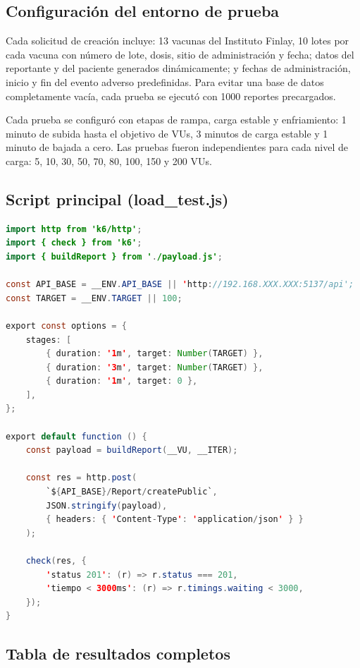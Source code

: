 \subsection{Configuración del entorno de prueba}

Cada solicitud de creación incluye: 13 vacunas del Instituto Finlay, 10 lotes por cada vacuna con número de lote, dosis, sitio de administración y fecha; datos del reportante y del paciente generados dinámicamente; y fechas de administración, inicio y fin del evento adverso predefinidas. Para evitar una base de datos completamente vacía, cada prueba se ejecutó con 1000 reportes precargados.

Cada prueba se configuró con etapas de rampa, carga estable y enfriamiento: 1 minuto de subida hasta el objetivo de VUs, 3 minutos de carga estable y 1 minuto de bajada a cero. Las pruebas fueron independientes para cada nivel de carga: 5, 10, 30, 50, 70, 80, 100, 150 y 200 VUs.


\subsection{Script principal (load\_test.js)}

\begin{lstlisting}[language=Java]
import http from 'k6/http';
import { check } from 'k6';
import { buildReport } from './payload.js';

const API_BASE = __ENV.API_BASE || 'http://192.168.XXX.XXX:5137/api';
const TARGET = __ENV.TARGET || 100;

export const options = {
    stages: [
        { duration: '1m', target: Number(TARGET) },
        { duration: '3m', target: Number(TARGET) },
        { duration: '1m', target: 0 },
    ],
};

export default function () {
    const payload = buildReport(__VU, __ITER);

    const res = http.post(
        `${API_BASE}/Report/createPublic`,
        JSON.stringify(payload),
        { headers: { 'Content-Type': 'application/json' } }
    );

    check(res, {
        'status 201': (r) => r.status === 201,
        'tiempo < 3000ms': (r) => r.timings.waiting < 3000,
    });
}
\end{lstlisting}

\subsection{Tabla de resultados completos}
\label{anexo:tabla_creacion_completa}

